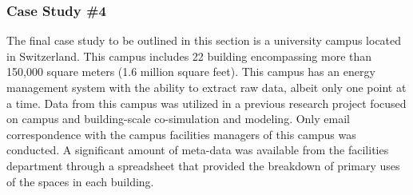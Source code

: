 \subsubsection{Case Study \#4}
\label{sec:casestudy4}

The final case study to be outlined in this section is a university campus located in Switzerland. This campus includes 22 building encompassing more than 150,000 square meters (1.6 million square feet). This campus has an energy management system with the ability to extract raw data, albeit only one point at a time. Data from this campus was utilized in a previous research project focused on campus and building-scale co-simulation and modeling. Only email correspondence with the campus facilities managers of this campus was conducted. A significant amount of meta-data was available from the facilities department through a spreadsheet that provided the breakdown of primary uses of the spaces in each building.